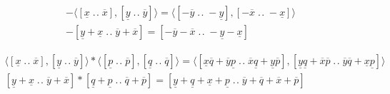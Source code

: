 \documentclass[11pt,,amssymb]{amsart}
\DeclareMathOperator{\till}{.\!.}
\begin{document}
\begin{align}
- \langle [\underline{x}\till\overline{x}],[\underline{y}\till\overline{y}] \rangle =
\langle [-\overline{y}\till-\underline{y}], [-\overline{x}\till-\underline{x}] \rangle
\\
-[\underline{y}+\underline{x}\till \overline{y}+\overline{x}] = 
[-\overline{y}-\overline{x} \till -\underline{y}-\underline{x}] 
\end{align}


\begin{align}
\langle [\underline{x}\till\overline{x}],[\underline{y}\till\overline{y}] \rangle * 
\langle [\underline{p}\till\overline{p}],[\underline{q}\till\overline{q}] \rangle =
\langle [\underline{x}\overline{q} + \overline{y}\underline{p} \till\overline{x}\underline{q} + \underline{y}\overline{p}],
[\underline{y}\underline{q}+\overline{x}\overline{p}\till\overline{y}\overline{q}+\underline{x}\underline{p}] \rangle
\\
[\underline{y}+\underline{x}\till \overline{y}+\overline{x}] * 
[\underline{q}+\underline{p}\till\overline{q}+\overline{p}] =
[\underline{y}+\underline{q}+\underline{x}+\underline{p}\till\overline{y}+\overline{q} + \overline{x}+\overline{p}]
\end{align}
\end{document}
